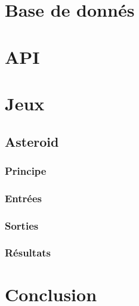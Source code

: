 \documentclass{article}
\begin{document}
\newpage
\section{Base de donnés}

\newpage
\section{API}

\newpage
\section{Jeux}
\subsection{Asteroid}
\subsubsection{Principe}
\subsubsection{Entrées}
\subsubsection{Sorties}
\subsubsection{Résultats}

\newpage
\section{Conclusion}

\newpage


\end{document}

